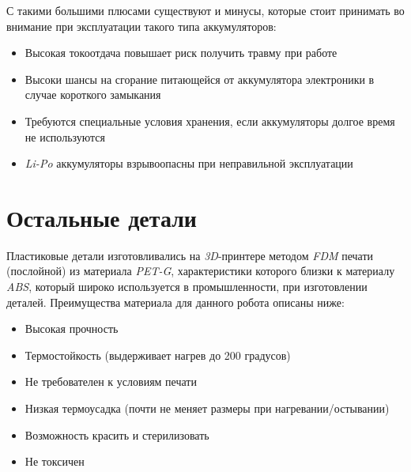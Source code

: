 С такими большими плюсами существуют и минусы, которые стоит принимать во внимание при эксплуатации такого типа аккумуляторов:
\begin{itemize}
    \item Высокая токоотдача повышает риск получить травму при работе
    \item Высоки шансы на сгорание питающейся от аккумулятора электроники в случае короткого замыкания
    \item Требуются специальные условия хранения, если аккумуляторы долгое время не используются
    \item \textit{Li-Po} аккумуляторы взрывоопасны при неправильной эксплуатации
\end{itemize}


\section{Остальные детали}
Пластиковые детали изготовливались на \textit{3D}-принтере методом \textit{FDM} печати (послойной) из материала \textit{PET-G}, характеристики которого близки к материалу \textit{ABS}, который широко используется в промышленности, при изготовлении деталей. Преимущества материала для данного робота описаны ниже:
\begin{itemize} %
    \item Высокая прочность %
    \item Термостойкость (выдерживает нагрев до 200 градусов)
    \item Не требователен к условиям печати
    \item Низкая термоусадка (почти не меняет размеры при нагревании/остывании)
    \item Возможность красить и стерилизовать
    \item Не токсичен
\end{itemize}
